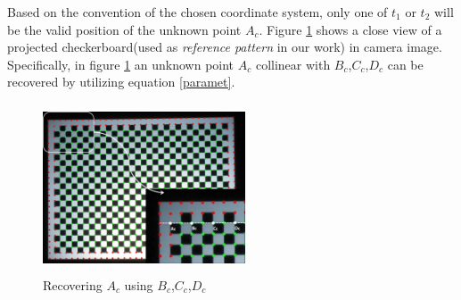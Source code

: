 \documentclass[letterpaper,10pt,conference]{/home/pranav/Desktop/Publication_work/latex_class_files/IEEEtran}
\begin{document}
Based on the convention of the chosen coordinate system, only one of $t_1$ or $t_2$ will be the valid position of the unknown point $A_c$. Figure \ref{cross_rat_img} shows a close view of a projected checkerboard(used as \textit{reference pattern} in our work) in camera image. Specifically, in figure \ref{cross_rat_img} an unknown point $A_c$ collinear with $B_c$,$C_c$,$D_c$ can be recovered by utilizing equation \ref{paramet}. 

\begin{figure}[ht]
\centering
\includegraphics[width=6cm,height=5cm]{figures/cross_rat_img.jpg} 
\caption{Recovering $A_c$ using $B_c$,$C_c$,$D_c$}
\label{cross_rat_img}
\end{figure}
\end{document}
